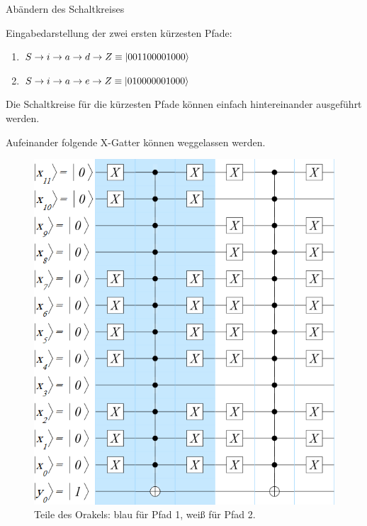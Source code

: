 \documentclass[fleqn,compress,utf8,aspectratio=169,t]{beamer}
\begin{document}
\begin{frame}{Abändern des Schaltkreises}
\begin{minipage}[t]{.65\textwidth}
Eingabedarstellung der zwei ersten kürzesten Pfade:
\begin{enumerate}
	\item $S \rightarrow i \rightarrow a \rightarrow d \rightarrow Z \equiv \ket{001100001000}$
	\item $S \rightarrow i \rightarrow a \rightarrow e \rightarrow Z \equiv \ket{010000001000}$
\end{enumerate}

Die Schaltkreise für die kürzesten Pfade können einfach hintereinander ausgeführt werden.

Aufeinander folgende X-Gatter können weggelassen werden.
\end{minipage}%
\begin{minipage}[t]{.35\textwidth}
\begin{figure}
	\includegraphics[height=.6\textheight]{images/2e.png}
	\caption{Teile des Orakels: blau für Pfad 1, weiß für Pfad 2.}
\end{figure}
\end{minipage}
\end{frame}
\end{document}
